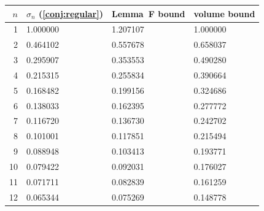 \begin{tabular}{r l l l}
\toprule
$n$ & $\sigma_n$ (\cref{conj:regular}) & Lemma~F bound & volume bound \\
\midrule
1 & 1.000000 & 1.207107 & 1.000000 \\
2 & 0.464102 & 0.557678 & 0.658037 \\
3 & 0.295907 & 0.353553 & 0.490280 \\
4 & 0.215315 & 0.255834 & 0.390664 \\
5 & 0.168482 & 0.199156 & 0.324686 \\
6 & 0.138033 & 0.162395 & 0.277772 \\
7 & 0.116720 & 0.136730 & 0.242702 \\
8 & 0.101001 & 0.117851 & 0.215494 \\
9 & 0.088948 & 0.103413 & 0.193771 \\
10 & 0.079422 & 0.092031 & 0.176027 \\
11 & 0.071711 & 0.082839 & 0.161259 \\
12 & 0.065344 & 0.075269 & 0.148778 \\
\bottomrule
\end{tabular}
